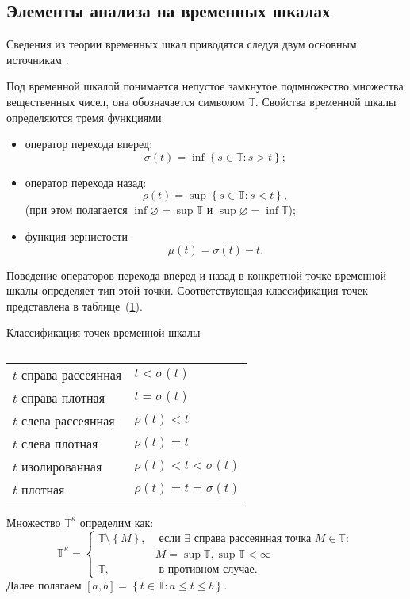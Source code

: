 \subsection{Элементы анализа на временных шкалах}

Сведения из теории временных шкал приводятся следуя двум основным
источникам \cite{Bohner,BohnerAdv}.

\begin{definition}
	Под временной шкалой понимается непустое замкнутое подмножество множества
	вещественных чисел, она обозначается символом $\mathbb{T}$.
	Свойства временной шкалы определяются тремя функциями:
	\begin{itemize}
		\item[1)] оператор перехода вперед:
		\[
		\sigma(t) = \inf\left\{s \in \mathbb{T}: s > t\right\};
		\]
		\item[2)] оператор перехода назад:
		\[
		\rho(t) = \sup\left\{s \in \mathbb{T}: s < t\right\},
		\]
		(при этом полагается $\inf\varnothing = \sup{\mathbb{T}}$ и $\sup\varnothing = \inf{\mathbb{T}}$);
		\item[3)] функция зернистости
		$$\mu(t) = \sigma(t) - t.$$
	\end{itemize}
\end{definition}
Поведение операторов перехода вперед и назад в конкретной точке временной шкалы
определяет тип этой точки. Соответствующая классификация точек представлена в
таблице~(\ref{tab:pointclass}).
\begin{table}[h]

	\centering		
		\caption{}	
		 Классификация точек временной шкалы\\
		\begin{tabular}{|l|l|}
			\hline
			$t$ справа рассеянная & $t < \sigma(t)$ \\
			$t$ справа плотная    & $t = \sigma(t)$ \\
			$t$ слева рассеянная  & $ \rho(t) < t $ \\
			$t$ слева плотная     & $ \rho(t) = t $ \\
			$t$ изолированная      & $\rho(t) < t < \sigma(t)$ \\
			$t$ плотная           & $\rho(t) = t = \sigma(t)$ \\
			\hline
		\end{tabular}
	
	\label{tab:pointclass}
\end{table}

\begin{definition}
	 Множество $\mathbb{T}^\kappa$ определим как:
	 \[
	 \mathbb{T}^\kappa =
	 \begin{cases}
	 \mathbb{T}\setminus \left\{M\right\}, & \text{ если }
	 \exists \text{ справа рассеянная точка } M \in \mathbb{T}:\\
	 & M = \sup\mathbb{T}, \sup\mathbb{T}<\infty  \\
	 \mathbb{T} , & \text{ в противном случае}.
	 \end{cases}
	 \]
	 Далее полагаем $\left[a, b\right] =
	 \left\{t \in \mathbb{T} : a \leqslant t \leqslant b\right\}$.
\end{definition}


